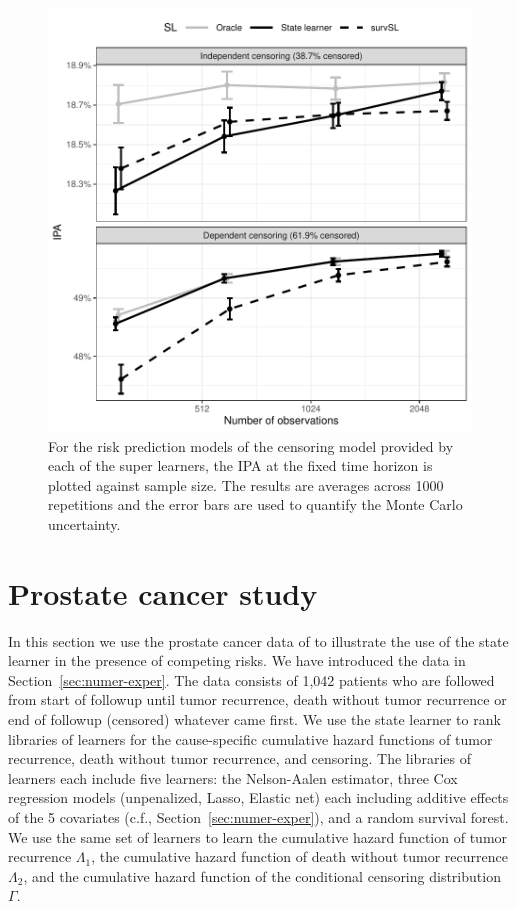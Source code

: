 \documentclass[a4paper,danish]{article}
\theoremstyle{plain} %
\numberwithin{theorem}{section}
\theoremstyle{definition} %
\theoremstyle{remark}
\newcommand{\1}{\mathds{1}}
\begin{document}
\begin{figure}
  \centering %
  \includegraphics[width=.7\linewidth]{experiment-fig-sl-survSL-cens.pdf}
  \caption[]{For the risk prediction models of the censoring model provided by
    each of the super learners, the IPA at the fixed time horizon is plotted
    against sample size. The results are averages across 1000 repetitions and
    the error bars are used to quantify the Monte Carlo uncertainty.}
  \label{fig:zelefski-cens}
\end{figure}


\section{Prostate cancer study}
\label{sec:real-data-appl}

In this section we use the prostate cancer data of
\cite{kattan2000pretreatment} to illustrate the use of the
state learner in the presence of competing risks. We have
introduced the data in Section~\ref{sec:numer-exper}. The data
consists of 1,042 patients who are followed from start of
followup until tumor recurrence, death without tumor
recurrence or end of followup (censored) whatever came first.
We use the state learner to rank libraries of learners for the
cause-specific cumulative hazard functions of tumor
recurrence, death without tumor recurrence, and censoring. The
libraries of learners each include five learners: the
Nelson-Aalen estimator, three Cox regression models
(unpenalized, Lasso, Elastic net) each including additive
effects of the 5 covariates (c.f., Section~\ref{sec:numer-exper}),
and a random survival forest. We use the same set of learners
to learn the cumulative hazard function of tumor recurrence
\( \Lambda_1 \), the cumulative hazard function of death
without tumor recurrence \( \Lambda_2 \), and the cumulative
hazard function of the conditional censoring distribution
$\Gamma$.
\end{document}
